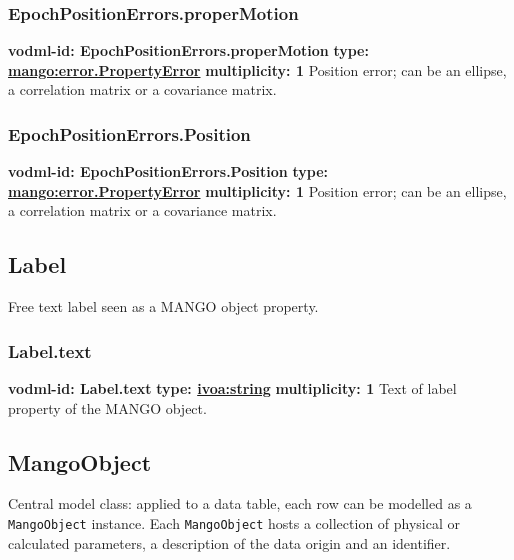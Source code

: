     \subsubsection{EpochPositionErrors.properMotion}
      \textbf{vodml-id: EpochPositionErrors.properMotion} \newline
      \textbf{type: \hyperref[sect:error.PropertyError]{mango:error.PropertyError}} \newline
      \textbf{multiplicity: 1} \newline
      Position error; can be an ellipse, a correlation matrix or a covariance matrix.

    \subsubsection{EpochPositionErrors.Position}
      \textbf{vodml-id: EpochPositionErrors.Position} \newline
      \textbf{type: \hyperref[sect:error.PropertyError]{mango:error.PropertyError}} \newline
      \textbf{multiplicity: 1} \newline
      Position error; can be an ellipse, a correlation matrix or a covariance matrix.

  \subsection{Label}
  \label{sect:Label}
    Free text label seen as a MANGO object property.

    \subsubsection{Label.text}
      \textbf{vodml-id: Label.text} \newline
      \textbf{type: \hyperref[sect:ivoa]{ivoa:string}} \newline
      \textbf{multiplicity: 1} \newline
      Text of label property of the MANGO object.

  \subsection{MangoObject}
  \label{sect:MangoObject}
    Central model class: applied to a data table, each row can be modelled as a \texttt{MangoObject} instance. Each \texttt{MangoObject} hosts a collection of physical or calculated parameters, a description of the data origin and an identifier.

